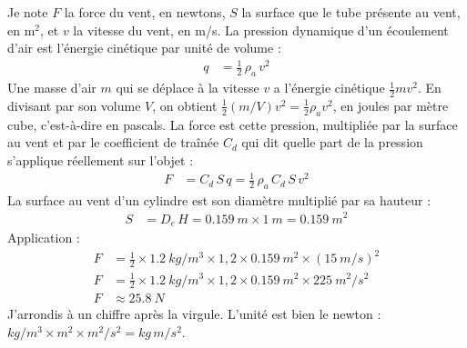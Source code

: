 \begin{demonstration}
Je note $F$ la force du vent, en newtons, $S$ la surface que le tube présente au vent, en m$^2$, et $v$ la vitesse du vent, en m/s. La pression dynamique d'un écoulement d'air est l'énergie cinétique par unité de volume :
\begin{align*}
q &= \frac{1}{2}\,\rho_a\, v^2
\end{align*}
Une masse d'air $m$ qui se déplace à la vitesse $v$ a l'énergie cinétique $\tfrac{1}{2} m v^2$. En divisant par son volume $V$, on obtient $\tfrac{1}{2} (m/V) v^2 = \tfrac{1}{2} \rho_a v^2$, en joules par mètre cube, c'est-à-dire en pascals. La force est cette pression, multipliée par la surface au vent et par le coefficient de traînée $C_d$ qui dit quelle part de la pression s'applique réellement sur l'objet :
\begin{align*}
F &= C_d\, S\, q = \frac{1}{2}\,\rho_a\, C_d\, S\, v^2
\end{align*}
La surface au vent d'un cylindre est son diamètre multiplié par sa hauteur :
\begin{align*}
S &= D_e \, H = \qty{0,159}{m} \times \qty{1}{m} = \qty{0,159}{m^2}
\end{align*}
Application :
\begin{align*}
F &= \frac{1}{2} \times \qty{1,2}{kg/m^3} \times 1{,}2 \times \qty{0,159}{m^2} \times (\qty{15}{m/s})^2\\
F &= \frac{1}{2} \times \qty{1,2}{kg/m^3} \times 1{,}2 \times \qty{0,159}{m^2} \times \qty{225}{m^2/s^2}\\
F &\approx \qty{25,8}{N}
\end{align*}
J'arrondis à un chiffre après la virgule. L'unité est bien le newton : $\unit{kg/m^3} \times \unit{m^2} \times \unit{m^2/s^2} = \unit{kg\,m/s^2}$.
\end{demonstration}

